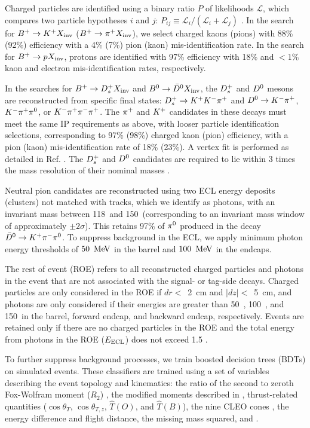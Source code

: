Charged particles are identified using a binary ratio $P$ of likelihoods $\mathcal{L}$, which compares two particle hypotheses $i$ and $j$: $P_{ij} \equiv \mathcal{L}_i / (\mathcal{L}_i + \mathcal{L}_j)$ \cite{Nakano:2002jw}. In the search for $B^+\rightarrow K^+X_{\rm{inv}}$ ($B^+\rightarrow\pi^+X_{\rm{inv}}$), we select charged kaons (pions) with 88\% (92\%) efficiency with a 4\% (7\%) pion (kaon) mis-identification rate. In the search for $B^+\rightarrow pX_{\rm{inv}}$, protons are identified with 97\% efficiency with 18\% and $<1\%$ kaon and electron mis-identification rates, respectively.

In the searches for $B^+\rightarrow D^+_sX_{\rm{inv}}$ and $B^0\rightarrow\kern 0.2em\bar{\kern -0.2em D}{}^0X_{\rm{inv}}$, the $D^+_s$ and $D^0$ mesons are reconstructed from specific final states: $D^+_s\rightarrow K^+K^-\pi^+$ and $D^0 \rightarrow K^-\pi^+$, $K^-\pi^+\pi^0$, or $K^-\pi^+\pi^-\pi^+$. The $\pi^+$ and $K^+$ candidates in these decays must meet the same IP requirements as above, with looser particle identification selections, corresponding to 97\% (98\%) charged kaon (pion) efficiency, with a pion (kaon) mis-identification rate of 18\% (23\%). A vertex fit is performed as detailed in Ref. \cite{Krohn_2020}. The $D^+_s$ and $D^0$ candidates are required to lie within 3 times the mass resolution of their nominal masses \cite{ParticleDataGroup:2024cfk}.

Neutral pion candidates are reconstructed using two ECL energy deposits (clusters) not matched with tracks, which we identify as photons, with an invariant mass between 118~\mevcc and 150~\mevcc (corresponding to an invariant mass window of approximately $\pm2\sigma$). This retains 97\% of $\pi^0$ produced in the decay $\kern 0.2em\bar{\kern -0.2em D}{}^0\rightarrow K^+\pi^-\pi^0$. To suppress background in the ECL, we apply minimum photon energy thresholds of $50~\mathrm{\,Me\kern -0.1em V}$ in the barrel and $100~\mathrm{\,Me\kern -0.1em V}$ in the endcaps.


The rest of event (ROE) refers to all reconstructed charged particles and photons in the event that are not associated with the signal- or tag-side decays. Charged particles are only considered in the ROE if $dr <$~2~cm and $|dz| <$~5~cm, and photons are only considered if their energies are greater than 50~\mev, 100~\mev, and 150~\mev in the barrel, forward endcap, and backward endcap, respectively. Events are retained only if there are no charged particles in the ROE and the total energy from photons in the ROE ($E_{\rm{ECL}}$) does not exceed 1.5 \gev.


To further suppress background processes, we train boosted decision trees (BDTs) \cite{Chen:2016:XST:2939672.2939785} on simulated events. These classifiers are trained using a set of variables describing the event topology and kinematics: the ratio of the second to zeroth Fox-Wolfram moment ($R_2$) \cite{PhysRevLett.41.1581}, the modified moments described in \cite{ABE2001151,PhysRevLett.91.261801}, thrust-related quantities ($\cos\theta_T$, $\cos\theta_{T,z}$, $\hat{T}(O)$, and $\hat{T}(B)$), the nine CLEO cones \cite{PhysRevD.53.1039}, the \Btag energy difference and flight distance, the missing mass squared, and \eecl \cite{Bevan_2014,kouBelleIIPhysics2019}.

